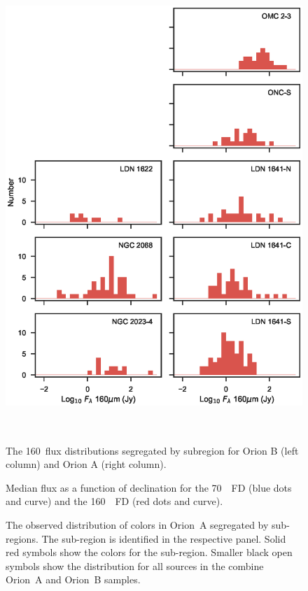 \documentclass[manuscript]{aastex}
\begin{document}
\begin{figure}[ht]
\centering
\includegraphics[height=7in]{figures/LF160_byregion.eps}
\caption{The 160\micron\ flux distributions segregated by subregion for Orion B (left column) and Orion A (right column).\label{fig:fd160regional}}
\end{figure}

\clearpage

\begin{figure}[ht]
\centering
{}
\caption{Median flux as a function of declination for the 70~\micron\ FD (blue dots and curve) and the 160~\micron\ FD (red dots and curve).\label{fig:mdFlux_v_dec}}
\end{figure}

\clearpage

\begin{figure}[ht]
\centering
{}
\caption{The observed distribution of colors in Orion~A segregated by sub-regions.  The sub-region is identified in the respective panel.  Solid red symbols show the colors for the sub-region.  Smaller black open symbols show the distribution for all sources in the combine Orion~A and Orion~B samples.\label{fig:clrclr1}}
\end{figure}
\end{document}
